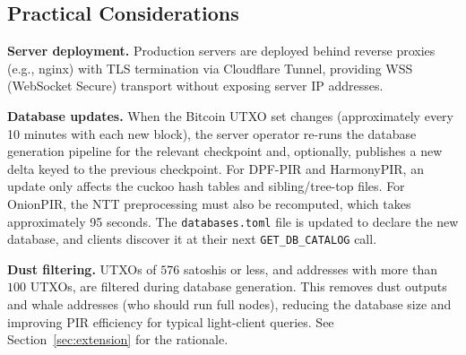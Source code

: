 \subsection{Practical Considerations}

\textbf{Server deployment.} Production servers are deployed behind reverse proxies (e.g., nginx) with TLS termination via Cloudflare Tunnel, providing WSS (WebSocket Secure) transport without exposing server IP addresses.

\textbf{Database updates.} When the Bitcoin UTXO set changes (approximately every 10 minutes with each new block), the server operator re-runs the database generation pipeline for the relevant checkpoint and, optionally, publishes a new delta keyed to the previous checkpoint. For DPF-PIR and HarmonyPIR, an update only affects the cuckoo hash tables and sibling/tree-top files. For OnionPIR, the NTT preprocessing must also be recomputed, which takes approximately 95 seconds. The \texttt{databases.toml} file is updated to declare the new database, and clients discover it at their next \texttt{GET\_DB\_CATALOG} call.

\textbf{Dust filtering.} UTXOs of $576$ satoshis or less, and addresses with more than $100$ UTXOs, are filtered during database generation. This removes dust outputs and whale addresses (who should run full nodes), reducing the database size and improving PIR efficiency for typical light-client queries. See Section~\ref{sec:extension} for the rationale.
